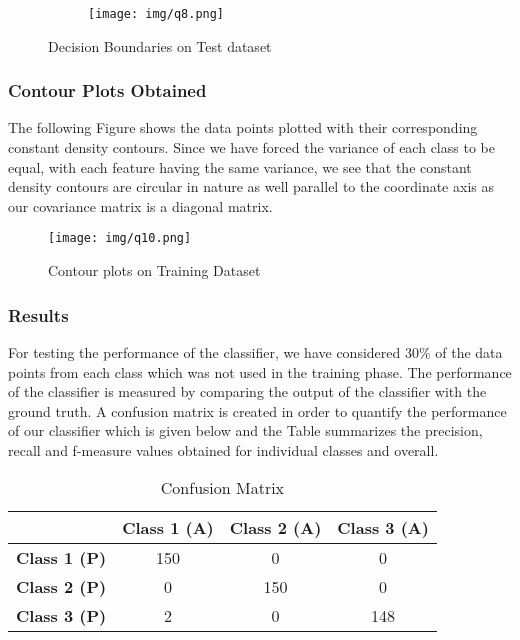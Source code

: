 \begin{figure}[!hbt]
    \centering
    \begin{subfigure}{0.49\textwidth}
        \texttt{[image: img/q8.png]}
    \end{subfigure}
\caption{Decision Boundaries on Test dataset}
\label{fig:Figure4}
\end{figure}

\subsubsection{Contour Plots Obtained}
The following Figure shows the data points plotted with their corresponding constant density contours. Since we have forced the variance of each class to be equal, with each feature having the same variance, we see that the constant density contours are circular in nature as well parallel to the coordinate axis as our covariance matrix is a diagonal matrix.\\

\begin{figure}[!hbt]
     \centering
     \texttt{[image: img/q10.png]}
     \caption{Contour plots on Training Dataset}
     \label{fig:Figure5}
\end{figure}

\subsubsection{Results}
For testing the performance of the classifier, we have considered 30\% of the data points from each class which was not used in the training phase. The performance of the classifier is measured by comparing the output of the classifier with the ground truth. A confusion matrix is created in order to quantify the performance of our classifier which is given below and the Table summarizes
the precision, recall and f-measure values obtained for individual classes and overall.\\

\begin{table}[H]
\centering
\begin{tabular}{|c|c|c|c|}
\hline
\ & \textbf{Class 1 (A)} & \textbf{Class 2 (A)} & \textbf{Class 3 (A)}\\
\hline
\textbf{Class 1 (P)} & 150 & 0 & 0 \\
\hline 
\textbf{Class 2 (P)} & 0 & 150 & 0 \\
\hline
\textbf{Class 3 (P)} & 2 & 0 & 148 \\
\hline
\end{tabular}
\caption{Confusion Matrix}
\label{tab:Table5}
\end{table}

